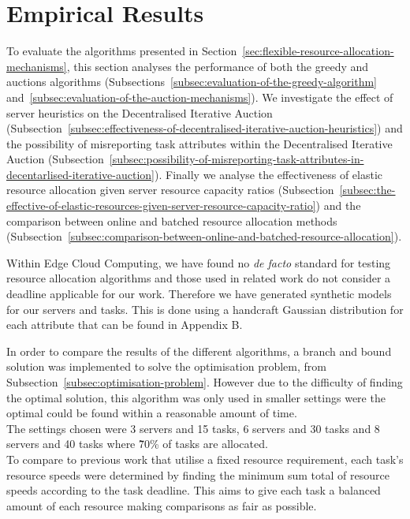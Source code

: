\section{Empirical Results}
\label{sec:empirical-results}
To evaluate the algorithms presented in Section~\ref{sec:flexible-resource-allocation-mechanisms},
this section analyses the performance of both the greedy and auctions algorithms
(Subsections~\ref{subsec:evaluation-of-the-greedy-algorithm} and~\ref{subsec:evaluation-of-the-auction-mechanisms}).
We investigate the effect of server heuristics on the Decentralised Iterative Auction
(Subsection~\ref{subsec:effectiveness-of-decentralised-iterative-auction-heuristics}) and
the possibility of misreporting task attributes within the Decentralised Iterative Auction
(Subsection~\ref{subsec:possibility-of-misreporting-task-attributes-in-decentarlised-iterative-auction}).
Finally we analyse the effectiveness of elastic resource allocation given server resource capacity ratios
(Subsection~\ref{subsec:the-effective-of-elastic-resources-given-server-resource-capacity-ratio})
and the comparison between online and batched resource allocation methods
(Subsection~\ref{subsec:comparison-between-online-and-batched-resource-allocation}).

Within Edge Cloud Computing, we have found no \emph{de facto} standard for testing resource allocation algorithms and
those used in related work do not consider a deadline applicable for our work. Therefore we have generated synthetic
models for our servers and tasks. This is done using a handcraft Gaussian distribution for each attribute that can be
found in Appendix B\@.

In order to compare the results of the different algorithms, a branch and bound solution was implemented to solve
the optimisation problem, from Subsection~\ref{subsec:optimisation-problem}. However due to the difficulty of
finding the optimal solution, this algorithm was only used in smaller settings were the optimal could be found within
a reasonable amount of time. \\
The settings chosen were 3 servers and 15 tasks, 6 servers and 30 tasks and 8 servers and 40 tasks where \~70\% of
tasks are allocated. \\
To compare to previous work that utilise a fixed resource requirement, each task's resource speeds were determined by
finding the minimum sum total of resource speeds according to the task deadline. This aims to give each task a
balanced amount of each resource making comparisons as fair as possible.

